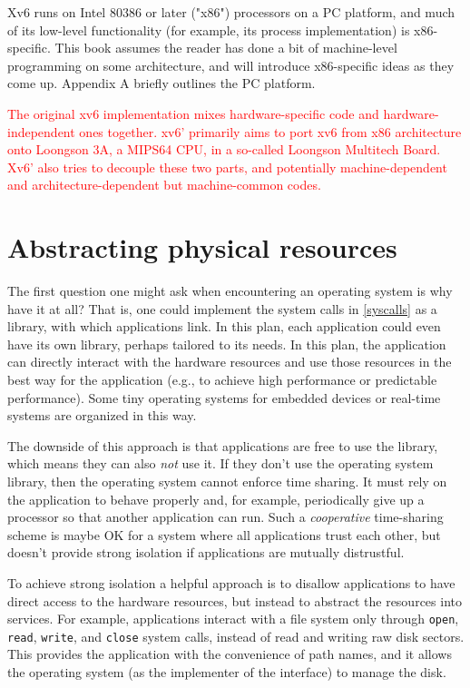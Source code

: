 \documentclass{report}
\begin{document}
	Xv6 runs on Intel 80386 or later ("x86") processors on a PC platform, and much
	of its low-level functionality (for example, its process implementation) is x86-specific.
	This book assumes the reader has done a bit of machine-level programming on some
	architecture, and will introduce x86-specific ideas as they come up. Appendix A briefly
	outlines the PC platform.
	
	\textcolor{red}{
		The original xv6 implementation mixes hardware-specific code and hardware-independent
		ones together.  xv6' primarily aims to port xv6 from x86 architecture onto Loongson 3A, a MIPS64
		CPU, in a so-called Loongson Multitech Board.  Xv6' also tries to decouple these two parts, 
		and potentially machine-dependent
		and architecture-dependent but machine-common codes.  
	}
	
	\section{Abstracting physical resources}
	The first question one might ask when encountering an operating system is why
	have it at all? That is, one could implement the system calls in \figurename{\ref{syscalls}} as a library,
	with which applications link. In this plan, each application could even have its own 
	library, perhaps tailored to its needs. In this plan, the application can directly interact
	with the hardware resources and use those resources in the best way for the application 
	(e.g., to achieve high performance or predictable performance). Some tiny operating 
	systems for embedded devices or real-time systems are organized in this way.
	
	The downside of this approach is that applications are free to use the library,
	which means they can also \emph{not} use it. If they don't use the operating system library,
	then the operating system cannot enforce time sharing. It must rely on the application
	to behave properly and, for example, periodically give up a processor so that another
	application can run. Such a \emph{cooperative} time-sharing scheme is maybe OK for a system 
	where all applications trust each other, but doesn't provide strong isolation if 
	applications are mutually distrustful.
	
	To achieve strong isolation a helpful approach is to disallow applications to have
	direct access to the hardware resources, but instead to abstract the resources into 
	services. For example, applications interact with a file system only through \texttt{open}, \texttt{read},
	\texttt{write}, and \texttt{close} system calls, instead of read and writing raw disk sectors. This 
	provides the application with the convenience of path names, and it allows the operating
	system (as the implementer of the interface) to manage the disk.
	
\end{document}

